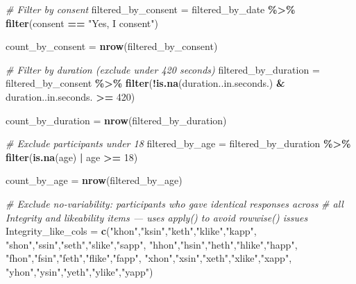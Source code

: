 \documentclass[
]{article}
\newenvironment{Shaded}{\begin{snugshade}}{\end{snugshade}}
\newcommand{\CommentTok}[1]{\textcolor[rgb]{0.56,0.35,0.01}{\textit{#1}}}
\newcommand{\DecValTok}[1]{\textcolor[rgb]{0.00,0.00,0.81}{#1}}
\newcommand{\FunctionTok}[1]{\textcolor[rgb]{0.13,0.29,0.53}{\textbf{#1}}}
\newcommand{\NormalTok}[1]{#1}
\newcommand{\OtherTok}[1]{\textcolor[rgb]{0.56,0.35,0.01}{#1}}
\newcommand{\SpecialCharTok}[1]{\textcolor[rgb]{0.81,0.36,0.00}{\textbf{#1}}}
\newcommand{\StringTok}[1]{\textcolor[rgb]{0.31,0.60,0.02}{#1}}
\begin{document}
\begin{Shaded}
\begin{Highlighting}[]
\CommentTok{\# Filter by consent}
\NormalTok{filtered\_by\_consent }\OtherTok{=}\NormalTok{ filtered\_by\_date }\SpecialCharTok{\%\textgreater{}\%}
  \FunctionTok{filter}\NormalTok{(consent }\SpecialCharTok{==} \StringTok{"Yes, I consent"}\NormalTok{)}

\NormalTok{count\_by\_consent }\OtherTok{=}  \FunctionTok{nrow}\NormalTok{(filtered\_by\_consent)}

\CommentTok{\# Filter by duration (exclude under 420 seconds)}
\NormalTok{filtered\_by\_duration }\OtherTok{=}\NormalTok{ filtered\_by\_consent }\SpecialCharTok{\%\textgreater{}\%}
  \FunctionTok{filter}\NormalTok{(}\SpecialCharTok{!}\FunctionTok{is.na}\NormalTok{(duration..in.seconds.) }\SpecialCharTok{\&}\NormalTok{ duration..in.seconds. }\SpecialCharTok{\textgreater{}=} \DecValTok{420}\NormalTok{)}

\NormalTok{count\_by\_duration }\OtherTok{=} \FunctionTok{nrow}\NormalTok{(filtered\_by\_duration)}

\CommentTok{\# Exclude participants under 18}
\NormalTok{filtered\_by\_age }\OtherTok{=}\NormalTok{ filtered\_by\_duration }\SpecialCharTok{\%\textgreater{}\%}
  \FunctionTok{filter}\NormalTok{(}\FunctionTok{is.na}\NormalTok{(age) }\SpecialCharTok{|}\NormalTok{ age }\SpecialCharTok{\textgreater{}=} \DecValTok{18}\NormalTok{)}

\NormalTok{count\_by\_age }\OtherTok{=} \FunctionTok{nrow}\NormalTok{(filtered\_by\_age)}


\CommentTok{\# Exclude no{-}variability: participants who gave identical responses across}
\CommentTok{\# all Integrity and likeability items — uses apply() to avoid rowwise() issues}
\NormalTok{Integrity\_like\_cols }\OtherTok{=} \FunctionTok{c}\NormalTok{(}\StringTok{"khon"}\NormalTok{,}\StringTok{"ksin"}\NormalTok{,}\StringTok{"keth"}\NormalTok{,}\StringTok{"klike"}\NormalTok{,}\StringTok{"kapp"}\NormalTok{,}
                    \StringTok{"shon"}\NormalTok{,}\StringTok{"ssin"}\NormalTok{,}\StringTok{"seth"}\NormalTok{,}\StringTok{"slike"}\NormalTok{,}\StringTok{"sapp"}\NormalTok{,}
                    \StringTok{"hhon"}\NormalTok{,}\StringTok{"hsin"}\NormalTok{,}\StringTok{"heth"}\NormalTok{,}\StringTok{"hlike"}\NormalTok{,}\StringTok{"happ"}\NormalTok{,}
                    \StringTok{"fhon"}\NormalTok{,}\StringTok{"fsin"}\NormalTok{,}\StringTok{"feth"}\NormalTok{,}\StringTok{"flike"}\NormalTok{,}\StringTok{"fapp"}\NormalTok{,}
                    \StringTok{"xhon"}\NormalTok{,}\StringTok{"xsin"}\NormalTok{,}\StringTok{"xeth"}\NormalTok{,}\StringTok{"xlike"}\NormalTok{,}\StringTok{"xapp"}\NormalTok{,}
                    \StringTok{"yhon"}\NormalTok{,}\StringTok{"ysin"}\NormalTok{,}\StringTok{"yeth"}\NormalTok{,}\StringTok{"ylike"}\NormalTok{,}\StringTok{"yapp"}\NormalTok{)}


\end{Highlighting}
\end{Shaded}
\end{document}
